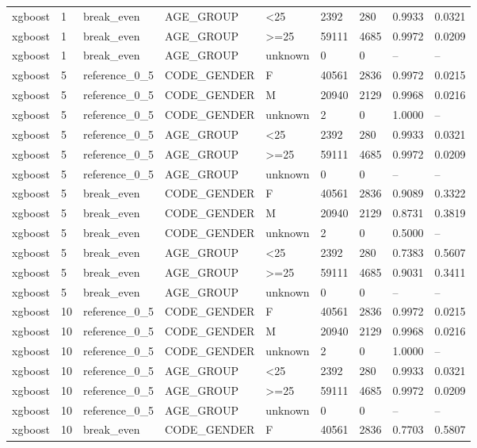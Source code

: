 \begin{longtable}{lllllllll}
xgboost & 1 & break\_even & AGE\_GROUP & <25 & 2392 & 280 & 0.9933 & 0.0321 \\
xgboost & 1 & break\_even & AGE\_GROUP & >=25 & 59111 & 4685 & 0.9972 & 0.0209 \\
xgboost & 1 & break\_even & AGE\_GROUP & unknown & 0 & 0 & -- & -- \\
xgboost & 5 & reference\_0\_5 & CODE\_GENDER & F & 40561 & 2836 & 0.9972 & 0.0215 \\
xgboost & 5 & reference\_0\_5 & CODE\_GENDER & M & 20940 & 2129 & 0.9968 & 0.0216 \\
xgboost & 5 & reference\_0\_5 & CODE\_GENDER & unknown & 2 & 0 & 1.0000 & -- \\
xgboost & 5 & reference\_0\_5 & AGE\_GROUP & <25 & 2392 & 280 & 0.9933 & 0.0321 \\
xgboost & 5 & reference\_0\_5 & AGE\_GROUP & >=25 & 59111 & 4685 & 0.9972 & 0.0209 \\
xgboost & 5 & reference\_0\_5 & AGE\_GROUP & unknown & 0 & 0 & -- & -- \\
xgboost & 5 & break\_even & CODE\_GENDER & F & 40561 & 2836 & 0.9089 & 0.3322 \\
xgboost & 5 & break\_even & CODE\_GENDER & M & 20940 & 2129 & 0.8731 & 0.3819 \\
xgboost & 5 & break\_even & CODE\_GENDER & unknown & 2 & 0 & 0.5000 & -- \\
xgboost & 5 & break\_even & AGE\_GROUP & <25 & 2392 & 280 & 0.7383 & 0.5607 \\
xgboost & 5 & break\_even & AGE\_GROUP & >=25 & 59111 & 4685 & 0.9031 & 0.3411 \\
xgboost & 5 & break\_even & AGE\_GROUP & unknown & 0 & 0 & -- & -- \\
xgboost & 10 & reference\_0\_5 & CODE\_GENDER & F & 40561 & 2836 & 0.9972 & 0.0215 \\
xgboost & 10 & reference\_0\_5 & CODE\_GENDER & M & 20940 & 2129 & 0.9968 & 0.0216 \\
xgboost & 10 & reference\_0\_5 & CODE\_GENDER & unknown & 2 & 0 & 1.0000 & -- \\
xgboost & 10 & reference\_0\_5 & AGE\_GROUP & <25 & 2392 & 280 & 0.9933 & 0.0321 \\
xgboost & 10 & reference\_0\_5 & AGE\_GROUP & >=25 & 59111 & 4685 & 0.9972 & 0.0209 \\
xgboost & 10 & reference\_0\_5 & AGE\_GROUP & unknown & 0 & 0 & -- & -- \\
xgboost & 10 & break\_even & CODE\_GENDER & F & 40561 & 2836 & 0.7703 & 0.5807 \\

\end{longtable}
